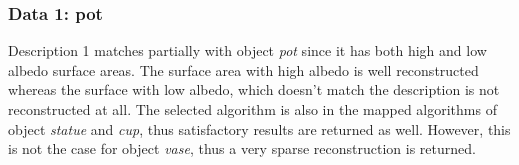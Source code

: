 \subsubsection{Data 1: pot}
Description 1 matches partially with object \textit{pot} since it has both high and low albedo surface areas. The surface area with high albedo is well reconstructed whereas the surface with low albedo, which doesn't match the description is not reconstructed at all. The selected algorithm is also in the mapped algorithms of object \textit{statue} and \textit{cup}, thus satisfactory results are returned as well. However, this is not the case for object \textit{vase}, thus a very sparse reconstruction is returned.






